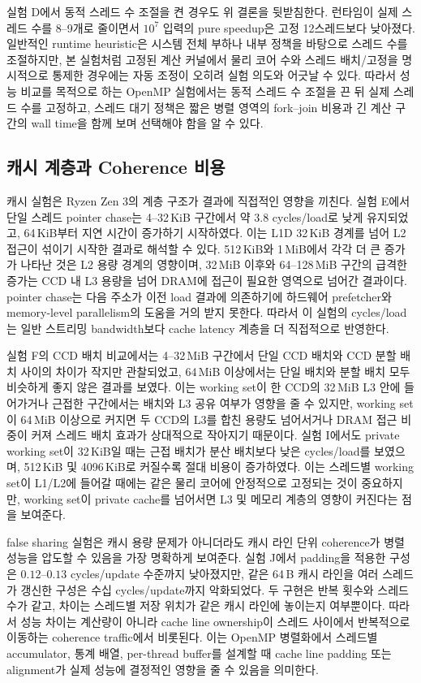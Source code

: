 \documentclass[11pt,a4paper]{article}
\begin{document}
실험 D에서 동적 스레드 수 조절을 켠 경우도 위 결론을 뒷받침한다. 런타임이 실제 스레드 수를 8--9개로 줄이면서 $10^7$ 입력의 pure speedup은 고정 12스레드보다 낮아졌다. 일반적인 runtime heuristic은 시스템 전체 부하나 내부 정책을 바탕으로 스레드 수를 조절하지만,
본 실험처럼 고정된 계산 커널에서 물리 코어 수와 스레드 배치/고정을 명시적으로 통제한 경우에는 자동 조정이 오히려 실험 의도와 어긋날 수 있다. 따라서 성능 비교를 목적으로 하는 OpenMP 실험에서는 동적 스레드 수 조절을 끈 뒤 실제 스레드 수를 고정하고, 스레드 대기 정책은 짧은 병렬 영역의 fork--join 비용과 긴 계산 구간의 wall time을 함께 보며 선택해야 함을 알 수 있다.

\subsection{캐시 계층과 Coherence 비용}

캐시 실험은 Ryzen Zen 3의 계층 구조가 결과에 직접적인 영향을 끼친다. 실험 E에서 단일 스레드 pointer chase는 4--32\,KiB 구간에서 약 $3.8$ cycles/load로 낮게 유지되었고, 64\,KiB부터 지연 시간이 증가하기 시작하였다. 이는 L1D 32\,KiB 경계를 넘어 L2 접근이 섞이기 시작한 결과로 해석할 수 있다. 512\,KiB와 1\,MiB에서 각각 더 큰 증가가 나타난
것은 L2 용량 경계의 영향이며, 32\,MiB 이후와 64--128\,MiB 구간의 급격한 증가는 CCD 내 L3 용량을 넘어 DRAM에 접근이 필요한 영역으로 넘어간 결과이다. pointer chase는 다음 주소가 이전 load 결과에 의존하기에 하드웨어 prefetcher와 memory-level parallelism의 도움을 거의 받지 못한다. 따라서 이 실험의 cycles/load는 일반 스트리밍 bandwidth보다 cache latency 계층을 더 직접적으로 반영한다.

실험 F의 CCD 배치 비교에서는 4--32\,MiB 구간에서 단일 CCD 배치와 CCD 분할 배치 사이의 차이가 작지만 관찰되었고, 64\,MiB 이상에서는 단일 배치와 분할 배치 모두 비슷하게 좋지 않은 결과를 보였다. 이는 working set이 한 CCD의 32\,MiB L3 안에 들어가거나 근접한 구간에서는 배치와 L3 공유 여부가 영향을 줄 수 있지만, working set이 64\,MiB 이상으로 커지면 두 CCD의 L3를 합친 용량도 넘어서거나 DRAM 접근 비중이 커져 스레드 배치 효과가 상대적으로 작아지기 때문이다. 실험 I에서도 private working set이 32\,KiB일 때는 근접 배치가 분산 배치보다 낮은 cycles/load를 보였으며, 512\,KiB 및 4096\,KiB로 커질수록 절대 비용이 증가하였다. 이는 스레드별 working set이 L1/L2에 들어갈 때에는 같은 물리 코어에 안정적으로 고정되는 것이 중요하지만, working set이 private cache를
넘어서면 L3 및 메모리 계층의 영향이 커진다는 점을 보여준다.

false sharing 실험은 캐시 용량 문제가 아니더라도 캐시 라인 단위 coherence가 병렬
성능을 압도할 수 있음을 가장 명확하게 보여준다. 실험 J에서 padding을 적용한 구성은
$0.12$--$0.13$ cycles/update 수준까지 낮아졌지만, 같은 64\,B 캐시 라인을 여러
스레드가 갱신한 구성은 수십 cycles/update까지 악화되었다. 두 구현은 반복 횟수와
스레드 수가 같고, 차이는 스레드별 저장 위치가 같은 캐시 라인에 놓이는지 여부뿐이다.
따라서 성능 차이는 계산량이 아니라 cache line ownership이 스레드 사이에서 반복적으로
이동하는 coherence traffic에서 비롯된다. 이는 OpenMP 병렬화에서 스레드별 accumulator,
통계 배열, per-thread buffer를 설계할 때 cache line padding 또는 alignment가 실제
성능에 결정적인 영향을 줄 수 있음을 의미한다.
\end{document}
